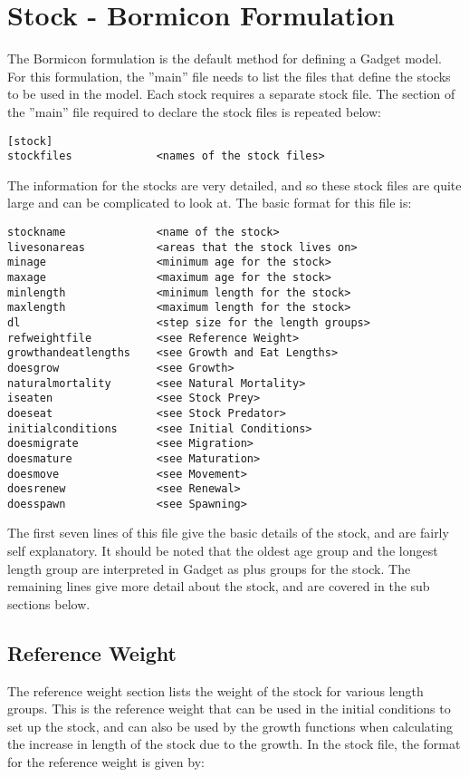 \documentclass [a4paper, 10pt]{book}
\begin{document}
\section{Stock - Bormicon Formulation}\label{sec:bormstock}
The Bormicon formulation is the default method for defining a Gadget model.  For this formulation, the ''main'' file needs to list the files that define the stocks to be used in the model.  Each stock requires a separate stock file.  The section of the ''main'' file required to declare the stock files is repeated below:

{\small\begin{verbatim}
[stock]
stockfiles             <names of the stock files>
\end{verbatim}}

The information for the stocks are very detailed, and so these stock files are quite large and can be complicated to look at.  The basic format for this file is:

{\small\begin{verbatim}
stockname              <name of the stock>
livesonareas           <areas that the stock lives on>
minage                 <minimum age for the stock>
maxage                 <maximum age for the stock>
minlength              <minimum length for the stock>
maxlength              <maximum length for the stock>
dl                     <step size for the length groups>
refweightfile          <see Reference Weight>
growthandeatlengths    <see Growth and Eat Lengths>
doesgrow               <see Growth>
naturalmortality       <see Natural Mortality>
iseaten                <see Stock Prey>
doeseat                <see Stock Predator>
initialconditions      <see Initial Conditions>
doesmigrate            <see Migration>
doesmature             <see Maturation>
doesmove               <see Movement>
doesrenew              <see Renewal>
doesspawn              <see Spawning>
\end{verbatim}}

The first seven lines of this file give the basic details of the stock, and are fairly self explanatory.  It should be noted that the oldest age group and the longest length group are interpreted in Gadget as plus groups for the stock.  The remaining lines give more detail about the stock, and are covered in the sub sections below.

\subsection{Reference Weight}\label{subsec:stockrefweight}
The reference weight section lists the weight of the stock for various length groups.  This is the reference weight that can be used in the initial conditions to set up the stock, and can also be used by the growth functions when calculating the increase in length of the stock due to the growth.  In the stock file, the format for the reference weight is given by:
\end{document}
